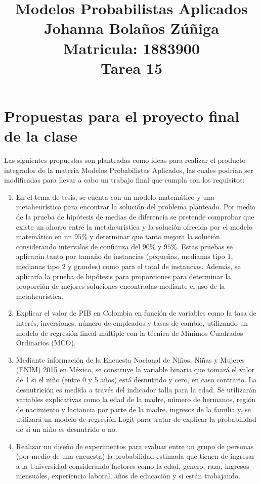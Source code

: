 \documentclass{article}
\title{
\centering
Modelos Probabilistas Aplicados \\
Johanna Bolaños Zúñiga \\
Matricula: 1883900\\
Tarea 15
}
\date{}
\begin{document}
\maketitle

\section{Propuestas para el proyecto final de la clase}

Las siguientes propuestas son planteadas como ideas para realizar el producto integrador de la materia Modelos Probabilistas Aplicados, las cuales podrían ser modificadas para llevar a cabo un trabajo final que cumpla con los requisitos:

\begin{enumerate}
    \item En el tema de tesis, se cuenta con un modelo matemático y una metaheurística para encontrar la solución del problema planteado. Por medio de la prueba de hipótesis de medias de diferencia se pretende comprobar que existe un ahorro entre la metaheurística y la solución ofrecida por el modelo matemático en un $95\%$ y determinar que tanto mejora la solución considerando intervalos de confianza del $90\%$ y $95\%$. Estas pruebas se aplicarán tanto por tamaño de instancias (pequeñas, medianas tipo $1$, medianas tipo $2$ y grandes) como para el total de instancias. Además, se aplicaría la prueba de hipótesis para proporciones para determinar la proporción de mejores soluciones encontradas mediante el uso de la metaheurística.
    \item Explicar el valor de PIB en Colombia en función de variables como la tasa de interés, inversiones, número de empleados y tasas de cambio, utilizando un modelo de regresión lineal múltiple con la técnica de Mínimos Cuadrados Ordinarios (MCO).
    \item Mediante información de la Encuesta Nacional de Niños, Niñas y Mujeres (ENIM) 2015 en México, se construye la variable binaria que tomará el valor de 1 si el niño (entre 0 y 5 años) está desnutrido y cero, en caso contrario. La desnutrición es medida a través del indicador talla para la edad. Se utilizarán variables explicativas como la edad de la madre, número de hermanos, región de nacimiento y lactancia por parte de la madre, ingresos de la familia y, se utilizará un modelo de regresión Logit para tratar de explicar la probabilidad de si un niño es desnutrido o no.
    \item Realizar un diseño de experimentos para evaluar entre un grupo de personas (por medio de una encuesta) la probabilidad estimada que tienen de ingresar a la Universidad considerando factores como la edad, genero, raza, ingresos mensuales, experiencia laboral, años de educación y si están trabajando.
\end{enumerate}


%
%
\end{document}
